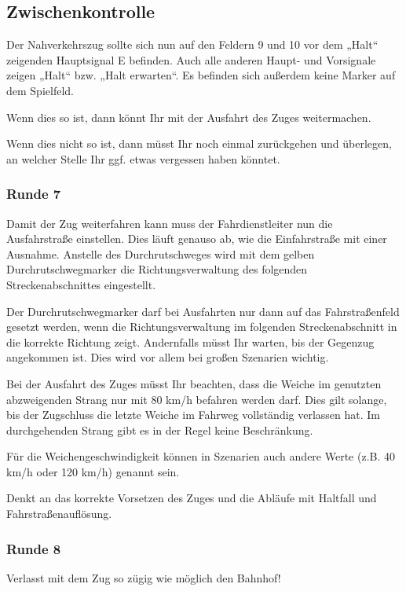 \subsection*{Zwischenkontrolle}
  Der Nahverkehrszug sollte sich nun auf den Feldern 9 und 10 vor dem „Halt“ zeigenden Hauptsignal E befinden. Auch alle anderen Haupt- und Vorsignale zeigen „Halt“ bzw. „Halt erwarten“. Es befinden sich außerdem keine Marker auf dem Spielfeld.
  \begin{framed}\noindent
    Wenn dies so ist, dann könnt Ihr mit der Ausfahrt des Zuges weitermachen.
  \end{framed}
  \begin{framed}\noindent
    Wenn dies nicht so ist, dann müsst Ihr noch einmal zurückgehen und überlegen, an welcher Stelle Ihr ggf. etwas vergessen haben könntet.
  \end{framed}


\subsubsection*{Runde 7}
  Damit der Zug weiterfahren kann muss der Fahrdienstleiter nun die Ausfahrstraße einstellen. Dies läuft genauso ab, wie die Einfahrstraße mit einer Ausnahme. Anstelle des Durchrutschweges wird mit dem gelben Durchrutschwegmarker die Richtungsverwaltung des folgenden Streckenabschnittes eingestellt.
  \begin{framed}\noindent
    Der Durchrutschwegmarker darf bei Ausfahrten nur dann auf das Fahrstraßenfeld gesetzt werden, wenn die Richtungsverwaltung im folgenden Streckenabschnitt in die korrekte Richtung zeigt. Andernfalls müsst Ihr warten, bis der Gegenzug angekommen ist. Dies wird vor allem bei großen Szenarien wichtig.
  \end{framed}
  Bei der Ausfahrt des Zuges müsst Ihr beachten, dass die Weiche im genutzten abzweigenden Strang nur mit 80 km/h befahren werden darf. Dies gilt solange, bis der Zugschluss die letzte Weiche im Fahrweg vollständig verlassen hat. Im durchgehenden Strang gibt es in der Regel keine Beschränkung.
  \begin{framed}\noindent
    Für die Weichengeschwindigkeit können in Szenarien auch andere Werte (z.B. 40 km/h oder 120 km/h) genannt sein.
  \end{framed}
  Denkt an das korrekte Vorsetzen des Zuges und die Abläufe mit Haltfall und Fahrstraßenauflösung.


\subsubsection*{Runde 8}
  Verlasst mit dem Zug so zügig wie möglich den Bahnhof!


